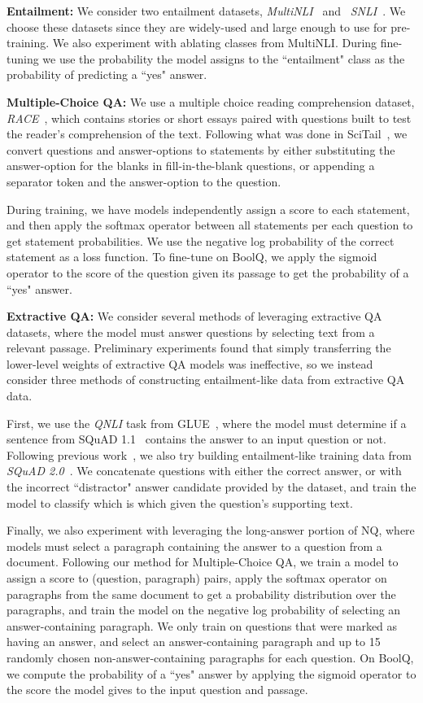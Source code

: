 \textbf{Entailment:} We consider two entailment  datasets, \textit{MultiNLI}~\cite{multinli} and ~\textit{SNLI}~\cite{snli}. We choose these datasets since they are widely-used and large enough to use for pre-training. We also experiment with ablating classes from MultiNLI. During fine-tuning we use the probability the model assigns to the ``entailment" class as the probability of predicting a ``yes" answer.

\textbf{Multiple-Choice QA:} We use a multiple choice reading comprehension dataset, \textit{RACE}~\cite{race}, which contains stories or short essays paired with questions built to test the reader's comprehension of the text. Following what was done in SciTail~\cite{scitail}, we convert questions and answer-options to statements by either substituting the answer-option for the blanks in fill-in-the-blank questions, or appending a separator token and the answer-option to the question.

During training, we have models independently assign a score to each statement, and then apply the softmax operator between all statements per each question to get statement probabilities. We use the negative log probability of the correct statement as a loss function. To fine-tune on BoolQ, we apply the sigmoid operator to the score of the question given its passage to get the probability of a ``yes" answer.

\textbf{Extractive QA:} We consider several methods of leveraging extractive QA datasets, where the model must answer questions by selecting text from a relevant passage. Preliminary experiments found that simply transferring the lower-level weights of extractive QA models was ineffective, so we instead consider three methods of constructing entailment-like data from extractive QA data.

First, we use the \textit{QNLI} task from GLUE~\cite{glue}, where the model must determine if a sentence from SQuAD 1.1~\cite{squad} contains the answer to an input question or not. Following previous work~\cite{hu2018read_verify}, we also try building entailment-like training data from \textit{SQuAD 2.0}~\cite{squad2}. We concatenate questions with either the correct answer, or with the incorrect ``distractor" answer candidate provided by the dataset, and train the model to classify which is which given the question's supporting text.

Finally, we also experiment with leveraging the long-answer portion of NQ, where models must select a paragraph containing the answer to a question from a document. Following our method for Multiple-Choice QA, we train a model to assign a score to (question, paragraph) pairs, apply the softmax operator on paragraphs from the same document to get a probability distribution over the paragraphs, and train the model on the negative log probability of selecting an answer-containing paragraph. We only train on questions that were marked as having an answer, and select an answer-containing paragraph and up to 15 randomly chosen non-answer-containing paragraphs for each question. On BoolQ, we compute the probability of a ``yes" answer by applying the sigmoid operator to the score the model gives to the input question and passage.

